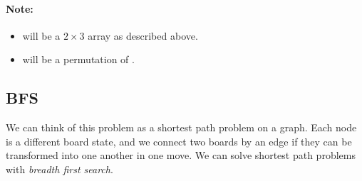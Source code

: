 \paragraph{Note:}

\begin{itemize}
\item {} will be a $2 \times 3$ array as described above.
\item {} will be a permutation of \fcj{[0, 1, 2, 3, 4, 5]}.
\end{itemize}

\subsection{BFS}
We can think of this problem as a shortest path problem on a graph. Each node is a different board state, and we connect two boards by an edge if they can be transformed into one another in one move. We can solve shortest path problems with \textit{breadth first search}.